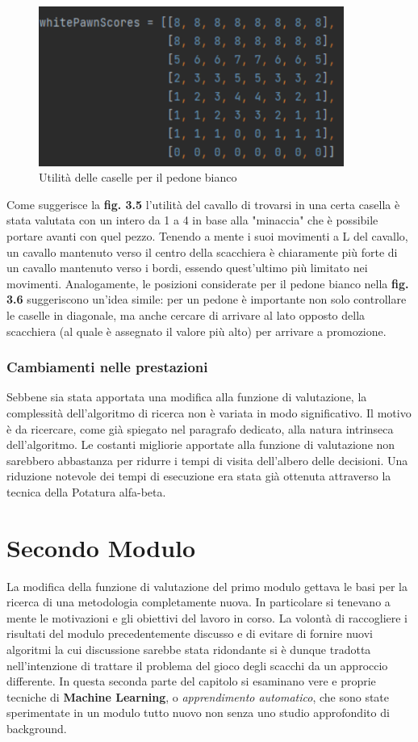 \begin{figure}[!htb]
    \includegraphics[width=10cm]{frontmatter/figure/pedone.pdf}
    \centering
    \caption{Utilità delle caselle per il pedone bianco}
    \label{fig:valore_pezzi}
\end{figure}
Come suggerisce la \textbf{fig. 3.5} l'utilità del cavallo di trovarsi in una certa casella è stata valutata con un intero da 1 a 4 in base alla "minaccia" che è possibile portare avanti con quel pezzo. Tenendo a mente i suoi movimenti a L del cavallo, un cavallo mantenuto verso il centro della scacchiera è chiaramente più forte di un cavallo mantenuto verso i bordi, essendo quest'ultimo più limitato nei movimenti. Analogamente, le posizioni considerate per il pedone bianco nella \textbf{fig. 3.6} suggeriscono un'idea simile: per un pedone è importante non solo controllare le caselle in diagonale, ma anche cercare di arrivare al lato opposto della scacchiera (al quale è assegnato il valore più alto) per arrivare a promozione. 

\subsubsection{Cambiamenti nelle prestazioni}
Sebbene sia stata apportata una modifica alla funzione di valutazione, la complessità dell'algoritmo di ricerca non è variata in modo significativo. Il motivo è da ricercare, come già spiegato nel paragrafo dedicato, alla natura intrinseca dell'algoritmo. Le costanti migliorie apportate alla funzione di valutazione non sarebbero abbastanza per ridurre i tempi di visita dell'albero delle decisioni. Una riduzione notevole dei tempi di esecuzione era stata già ottenuta attraverso la tecnica della Potatura alfa-beta.

\section{Secondo Modulo}
La modifica della funzione di valutazione del primo modulo gettava le basi per la ricerca di una metodologia completamente nuova. In particolare si tenevano a mente le motivazioni e gli obiettivi del lavoro in corso. La volontà di raccogliere i risultati del modulo precedentemente discusso e di evitare di fornire nuovi algoritmi la cui discussione sarebbe stata ridondante si è dunque tradotta nell'intenzione di trattare il problema del gioco degli scacchi da un approccio differente. In questa seconda parte del capitolo si esaminano vere e proprie tecniche di \textbf{Machine Learning}, o \textit{apprendimento automatico}, che sono state sperimentate in un modulo tutto nuovo non senza uno studio approfondito di background.

